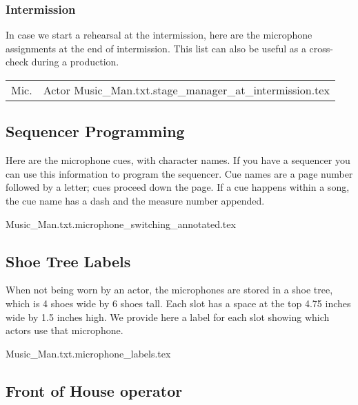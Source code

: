 \documentclass[letterpaper]{article}
\begin{document}
\subsubsection {Intermission}

In case we start a rehearsal at the intermission, here are the microphone
assignments at the end of intermission.  This list can also be useful as a 
cross-check during a production.

\begin{center}
\begin{longtable}{|l|l|}
\hline Mic. & Actor \endhead \hline
 {Music_Man.txt.stage_manager_at_intermission.tex}
\end{longtable}
\end{center}

\subsection {Sequencer Programming}

Here are the microphone cues, with character names.  If you
have a sequencer you can use this information to program
the sequencer.  Cue names are a page number followed by a letter; cues
proceed down the page.  If a cue happens within a song, the cue name
has a dash and the measure number appended.

 {Music_Man.txt.microphone_switching_annotated.tex}

\subsection {Shoe Tree Labels}

When not being worn by an actor, the microphones are stored in a shoe tree,
which is 4 shoes wide by 6 shoes tall.  
Each slot has a space at the top 4.75 inches wide
by 1.5 inches high.  We provide here a label for each slot showing which
actors use that microphone.

{\Large
 {Music_Man.txt.microphone_labels.tex}
}

\subsection {Front of House operator}
\end{document}
